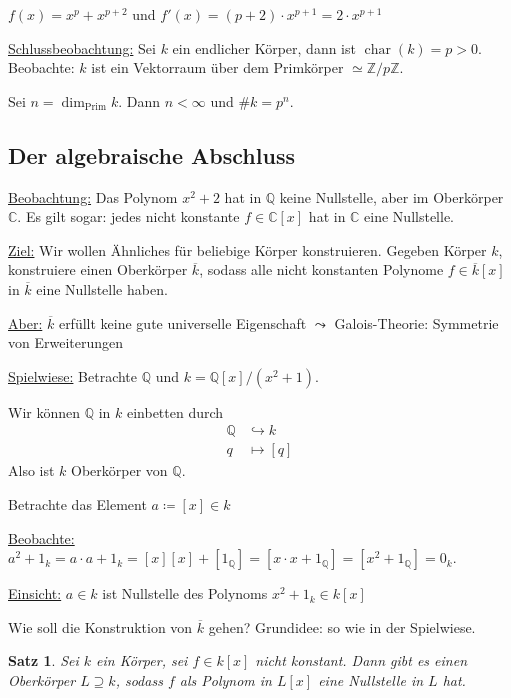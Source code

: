 \documentclass[a4paper,12pt,numbers=noenddot,parskip=full]{scrartcl}
\newcommand{\setZ}{\mathbb{Z}}
\newcommand{\setQ}{\mathbb{Q}}
\newcommand{\setC}{\mathbb{C}}
\newcommand{\heading}{\underline}
\theoremstyle{dotless}
\newtheorem{theorem}{Satz}[section]
\theoremstyle{remark}
\begin{document}
	$f(x) = x^p + x^{p+2}$ und $f'(x) = (p + 2) \cdot x^{p+1} = 2 \cdot x^{p+1}$
	
	\heading{Schlussbeobachtung:} Sei $k$ ein endlicher Körper, dann ist $\operatorname{char}(k) = p > 0$. Beobachte: $k$ ist ein Vektorraum über dem Primkörper $\simeq \setZ / p \setZ$.
	
	Sei $n = \dim_\text{Prim} k$. Dann $n < \infty$ und $\#k = p^n$.
	
	\subsection{Der algebraische Abschluss}
	
	\heading{Beobachtung:} Das Polynom $x^2 + 2$ hat in $\setQ$ keine Nullstelle, aber im Oberkörper $\setC$. Es gilt sogar: jedes nicht konstante $f \in \setC[x]$ hat in $\setC$ eine Nullstelle.
	
	\heading{Ziel:} Wir wollen Ähnliches für beliebige Körper konstruieren. Gegeben Körper $k$, konstruiere einen Oberkörper $\overline{k}$, sodass alle nicht konstanten Polynome $f \in \overline{k}[x]$ in $\overline{k}$ eine Nullstelle haben.
	
	\heading{Aber:} $\overline{k}$ erfüllt keine gute universelle Eigenschaft $\leadsto$ Galois-Theorie: Symmetrie von Erweiterungen
	
	\heading{Spielwiese:} Betrachte $\setQ$ und $k = \setQ[x]/(x^2 + 1)$.
	
	Wir können $\setQ$ in $k$ einbetten durch
	\begin{align*}
		\setQ &\hookrightarrow k \\
		q &\mapsto [q]
	\end{align*}
	Also ist $k$ Oberkörper von $\setQ$.
	
	Betrachte das Element $a \coloneqq [x] \in k$
	
	\heading{Beobachte:} $a^2 + 1_k = a \cdot a + 1_k = [x] [x] + [1_\setQ] = [x \cdot x + 1_\setQ] = [x^2 + 1_\setQ] = 0_k$.
	
	\heading{Einsicht:} $a \in k$ ist Nullstelle des Polynoms $x^2 + 1_k \in k[x]$
	
	Wie soll die Konstruktion von $\overline{k}$ gehen? Grundidee: so wie in der Spielwiese.
	
	\begin{theorem}
		Sei $k$ ein Körper, sei $f \in k[x]$ nicht konstant. Dann gibt es einen Oberkörper $L \supseteq k$, sodass $f$ als Polynom in $L[x]$ eine Nullstelle in $L$ hat.
	\end{theorem}
\end{document}
